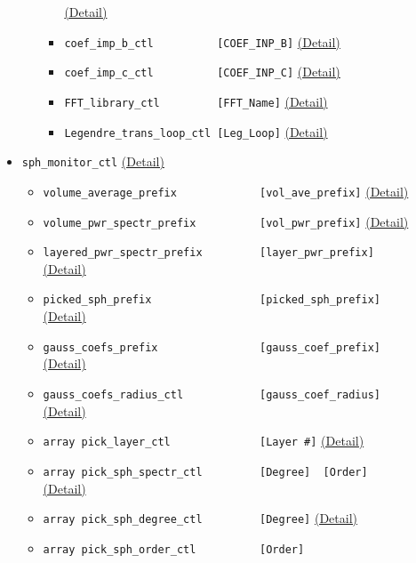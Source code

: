 \begin{itemize}
\begin{itemize}
\begin{itemize}
	    		\hyperref[href_t:coef_imp_t_ctl]{(Detail)}
		\item \verb|coef_imp_b_ctl          [COEF_INP_B]|
	    		\hyperref[href_t:coef_imp_b_ctl]{(Detail)}
		\item \verb|coef_imp_c_ctl          [COEF_INP_C]|
	    		\hyperref[href_t:coef_imp_c_ctl]{(Detail)}
		\item \verb|FFT_library_ctl         [FFT_Name]|
	    		\hyperref[href_t:FFT_library_ctl]{(Detail)}
		\item \verb|Legendre_trans_loop_ctl [Leg_Loop]|
	    		\hyperref[href_t:Legendre_trans_loop_ctl]{(Detail)}
		\end{itemize}
%
	\end{itemize}
%
\item \verb|sph_monitor_ctl|
	\label{href_i:sph_monitor_ctl}
	\hyperref[href_t:sph_monitor_ctl]{(Detail)}
	\begin{itemize}
	\item \verb|volume_average_prefix             [vol_ave_prefix]|
    		\hyperref[href_t:volume_average_prefix]{(Detail)}
	\item \verb|volume_pwr_spectr_prefix          [vol_pwr_prefix]|
    		\hyperref[href_t:volume_pwr_spectr_prefix]{(Detail)}
	\item \verb|layered_pwr_spectr_prefix         [layer_pwr_prefix]| \\
    		\hyperref[href_t:layered_pwr_spectr_prefix]{(Detail)}
	\item \verb|picked_sph_prefix                 [picked_sph_prefix]| \\
    		\hyperref[href_t:picked_sph_prefix]{(Detail)}
	\item \verb|gauss_coefs_prefix                [gauss_coef_prefix]| \\
    		\hyperref[href_t:gauss_coefs_prefix]{(Detail)}
	\item \verb|gauss_coefs_radius_ctl            [gauss_coef_radius]| \\
    		\hyperref[href_t:gauss_coefs_radius_ctl]{(Detail)}
	\item \verb|array pick_layer_ctl              [Layer #]|
    		\hyperref[href_t:pick_layer_ctl]{(Detail)}
	\item \verb|array pick_sph_spectr_ctl         [Degree]  [Order]| \\
    		\hyperref[href_t:pick_sph_spectr_ctl]{(Detail)}
	\item \verb|array pick_sph_degree_ctl         [Degree]|
    		\hyperref[href_t:pick_sph_degree_ctl]{(Detail)}
	\item \verb|array pick_sph_order_ctl          [Order]|

\end{itemize}
\end{itemize}
